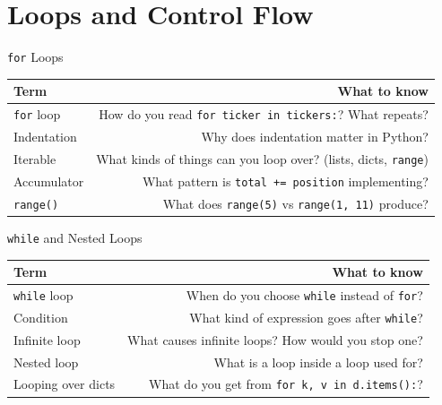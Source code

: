\documentclass[9pt,aspectratio=169]{beamer}
\begin{document}
\section{Loops and Control Flow}

\begin{frame}{\texttt{for} Loops}

\begin{tabular}{@{}lR@{}}
\toprule
\textbf{Term} & \textbf{What to know} \\
\midrule
\alert{\texttt{for} loop} & How do you read \texttt{for ticker in tickers:}? What repeats? \\[0.8em]
\alert{Indentation} & Why does indentation matter in Python? \\[0.8em]
\alert{Iterable} & What kinds of things can you loop over? (lists, dicts, \texttt{range}) \\[0.8em]
\alert{Accumulator} & What pattern is \texttt{total += position} implementing? \\[0.8em]
\alert{\texttt{range()}} & What does \texttt{range(5)} vs \texttt{range(1, 11)} produce? \\
\bottomrule
\end{tabular}

\end{frame}


\begin{frame}{\texttt{while} and Nested Loops}

\begin{tabular}{@{}lR@{}}
\toprule
\textbf{Term} & \textbf{What to know} \\
\midrule
\alert{\texttt{while} loop} & When do you choose \texttt{while} instead of \texttt{for}? \\[0.8em]
\alert{Condition} & What kind of expression goes after \texttt{while}? \\[0.8em]
\alert{Infinite loop} & What causes infinite loops? How would you stop one? \\[0.8em]
\alert{Nested loop} & What is a loop inside a loop used for? \\[0.8em]
\alert{Looping over dicts} & What do you get from \texttt{for k, v in d.items():}? \\
\bottomrule
\end{tabular}

\end{frame}
\end{document}
